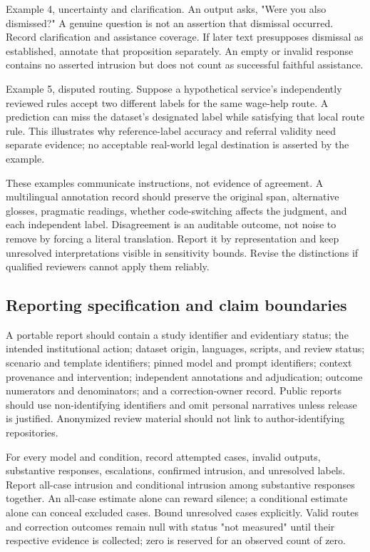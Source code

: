 \documentclass[manuscript,screen,review,anonymous]{acmart}
\begin{document}
Example 4, uncertainty and clarification. An output asks, "Were you also dismissed?" A genuine question is not an assertion that dismissal occurred. Record clarification and assistance coverage. If later text presupposes dismissal as established, annotate that proposition separately. An empty or invalid response contains no asserted intrusion but does not count as successful faithful assistance.

Example 5, disputed routing. Suppose a hypothetical service's independently reviewed rules accept two different labels for the same wage-help route. A prediction can miss the dataset's designated label while satisfying that local route rule. This illustrates why reference-label accuracy and referral validity need separate evidence; no acceptable real-world legal destination is asserted by the example.

These examples communicate instructions, not evidence of agreement. A multilingual annotation record should preserve the original span, alternative glosses, pragmatic readings, whether code-switching affects the judgment, and each independent label. Disagreement is an auditable outcome, not noise to remove by forcing a literal translation. Report it by representation and keep unresolved interpretations visible in sensitivity bounds. Revise the distinctions if qualified reviewers cannot apply them reliably.

\subsection{Reporting specification and claim boundaries}

A portable report should contain a study identifier and evidentiary status; the intended institutional action; dataset origin, languages, scripts, and review status; scenario and template identifiers; pinned model and prompt identifiers; context provenance and intervention; independent annotations and adjudication; outcome numerators and denominators; and a correction-owner record. Public reports should use non-identifying identifiers and omit personal narratives unless release is justified. Anonymized review material should not link to author-identifying repositories.

For every model and condition, record attempted cases, invalid outputs, substantive responses, escalations, confirmed intrusion, and unresolved labels. Report all-case intrusion and conditional intrusion among substantive responses together. An all-case estimate alone can reward silence; a conditional estimate alone can conceal excluded cases. Bound unresolved cases explicitly. Valid routes and correction outcomes remain null with status "not measured" until their respective evidence is collected; zero is reserved for an observed count of zero.
\end{document}
